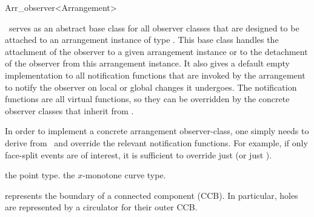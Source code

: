 
\ccRefPageBegin

\begin{ccRefClass}{Arr_observer<Arrangement>}
\label{arr_ref:arr_obs}

\ccDefinition

\ccClassTemplateName\ serves as an abstract base class for all observer
classes that are designed to be attached to an arrangement instance of
type . This base class handles the attachment of the
observer to a given arrangement instance or to the detachment of the
observer from this arrangement instance. It also gives a default empty
implementation to all notification functions that are invoked by the
arrangement to notify the observer on local or global changes it undergoes.
The notification functions are all virtual functions, so they can be
overridden by the concrete observer classes that inherit from
\ccClassTemplateName.

In order to implement a concrete arrangement observer-class, one simply
needs to derive from \ccClassTemplateName\ and override the relevant
notification functions. For example, if only face-split events are of
interest, it is sufficient to override just  
(or just ).


\ccTypes


    {the point type.}
\ccGlue
{}
    {the $x$-monotone curve type.}

\ccGlue
{}
\ccGlue
{}
\ccGlue
{}
    {represents the boundary of a connected component (CCB).
     In particular, holes are represented by a circulator for their outer CCB.}


\end{ccRefClass}
